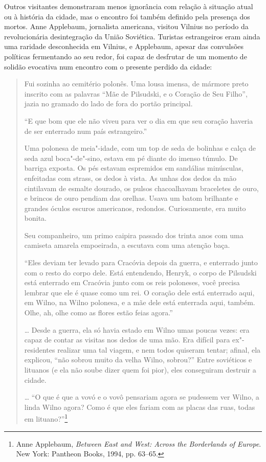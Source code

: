 Outros visitantes demonstraram menos ignorância com relação à situação
atual ou à história da cidade, mas o encontro foi também definido pela
presença dos mortos. Anne Applebaum, jornalista americana, visitou
Vilnius no período da revolucionária desintegração da União Soviética.
Turistas estrangeiros eram ainda uma raridade desconhecida em Vilnius, e
Applebaum, apesar das convulsões políticas fermentando ao seu redor, foi
capaz de desfrutar de um momento de solidão evocativa num encontro com o
presente perdido da cidade:

\begin{quote}
Fui sozinha ao cemitério polonês. Uma lousa imensa, de mármore preto
inscrito com as palavras ``Mãe de Pilsudski, e o Coração de Seu Filho'',
jazia no gramado do lado de fora do portão principal.

``E que bom que ele não viveu para ver o dia em que seu coração haveria
de ser enterrado num país estrangeiro.''

Uma polonesa de meia"-idade, com um top de seda de bolinhas e calça de
seda azul boca"-de"-sino, estava em pé diante do imenso túmulo. De barriga
exposta. Os pés estavam espremidos em sandálias minúsculas, enfeitadas
com strass, os dedos à vista. As unhas dos dedos da mão cintilavam de
esmalte dourado, os pulsos chacoalhavam braceletes de ouro, e brincos de
ouro pendiam das orelhas. Usava um batom brilhante e grandes óculos
escuros americanos, redondos. Curiosamente, era muito bonita.

Seu companheiro, um primo caipira passado dos trinta anos com uma
camiseta amarela empoeirada, a escutava com uma atenção baça.

``Eles deviam ter levado para Cracóvia depois da guerra, e enterrado
junto com o resto do corpo dele. Está entendendo, Henryk, o corpo de
Pilsudski está enterrado em Cracóvia junto com os reis poloneses, você
precisa lembrar que ele é quase como um rei. O coração dele está
enterrado aqui, em Wilno, na Wilno polonesa, e a mãe dele está enterrada
aqui, também. Olhe, ah, olhe como as flores estão feias agora.''

\ldots{} Desde a guerra, ela só havia estado em Wilno umas poucas vezes:
era capaz de contar as visitas nos dedos de uma mão. Era difícil para
ex"-residentes realizar uma tal viagem, e nem todos quiseram tentar;
afinal, ela explicou, ``não sobrou muito da velha Wilno, sobrou?'' Entre
soviéticos e lituanos (e ela não soube dizer quem foi pior), eles
conseguiram destruir a cidade.

\ldots{} ``O que é que a vovó e o vovô pensariam agora se pudessem ver
Wilno, a linda Wilno agora? Como é que eles fariam com as placas das
ruas, todas em lituano?''\footnote{Anne Applebaum, \emph{Between East
  and West: Across the Borderlands of Europe}. New York: Pantheon Books,
  1994, pp. 63--65.}
\end{quote}

